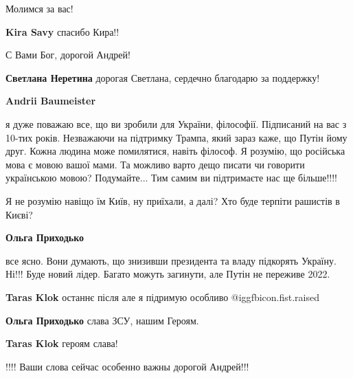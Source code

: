  
 
 
 
 
\zzSecCmt

\begin{itemize} %
Молимся за вас!


\textbf{Kira Savy} спасибо Кира!!

С Вами Бог, дорогой Андрей!

\begin{itemize} %
\textbf{Светлана Неретина} дорогая Светлана, сердечно благодарю за поддержку!

\textbf{Andrii Baumeister} 

я дуже поважаю все, що ви зробили для України, філософії. Підписаний на вас з
10-тих років. Незважаючи на підтримку Трампа, який зараз каже, що Путін йому
друг. Кожна людина може помилятися, навіть філософ. Я розумію, що російська
мова є мовою вашої мами. Та можливо варто дещо писати чи говорити українською
мовою? Подумайте... Тим самим ви підтримаєте нас ще більше!!!!

\end{itemize} %

Я не розумію навіщо їм Київ, ну приїхали, а далі? Хто буде терпіти рашистів в Києві?

\begin{itemize} %
\textbf{Ольга Приходько} 

все ясно. Вони думають, що знизивши президента та владу підкорять Україну.
Ні!!! Буде новий лідер. Багато можуть загинути, але Путін не переживе 2022.

\textbf{Taras Klok} останнє після але я підримую особливо  @igg{fbicon.fist.raised} 

\textbf{Ольга Приходько} слава ЗСУ, нашим Героям.

\textbf{Taras Klok} героям слава!
\end{itemize} %

!!!! Ваши слова сейчас особенно важны дорогой Андрей!!!


\end{itemize}
